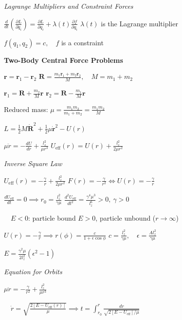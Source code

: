 \documentclass[twocolumn]{article}
\begin{document}
\vspace{-.5em}
\dotfill

\textit{Lagrange Multipliers and Constraint Forces}

$\frac{d}{dt} \left( \frac{\partial L}{\partial \dot{q}_i} \right) = \frac{\partial L}{\partial q_i} + \lambda(t) \frac{\partial f}{\partial q_i}$ \hfill $\lambda(t)$ is the Lagrange multiplier
 
$f(q_1, q_2) = c, \quad f$ is a constraint

\vspace{-.5em}
\dotfill

\textbf{Two-Body Central Force Problems}

$\mathbf{r} = \mathbf{r}_1 - \mathbf{r}_2$ \hfill $\mathbf{R} = \frac{m_1\mathbf{r}_1 + m_2\mathbf{r}_2}{M}, \quad M = m_1 + m_2$

$\mathbf r_1 = \mathbf R + \frac{m_2}{M} \mathbf r$ \hfill $\mathbf r_2 = \mathbf R - \frac{m_1}{M} \mathbf r$

Reduced mass: $\mu = \frac{m_1 m_2}{m_1 + m_2} = \frac{m_1 m_2}{M}$

$L = \frac{1}{2} M\dot{\mathbf{R}}^2 + \frac{1}{2} \mu \mathbf{\dot{r}}^2 - U(r)$

$\mu \ddot r = -\frac{dU}{dr} + \frac{l_z^2}{\mu r^3}$ \hfill $U_{\text{eff}}(r) = U(r) + \frac{l_z^2}{2\mu r^2}$

\dotfill

\textit{Inverse Square Law}

$U_{\text{eff}}(r) = -\frac{\gamma}{r} + \frac{l_z^2}{2 \mu r^2}$ \hfill $F(r) = -\frac{\gamma}{r^2} \iff U(r) = -\frac{\gamma}{r}$

$\frac{dU_{\text{eff}}}{dt} = 0 \implies r_0 = \frac{l_z^2}{\gamma \mu}$ \hfill $\frac{d^2 U_{\text{eff}}}{dt^2} = \frac{\gamma^4 \mu^3}{l_z^6} > 0,\ \gamma > 0$

$\quad E < 0$: particle bound \hfill $E > 0$, particle unbound ($r \to \infty$)

$U(r) = -\frac{\gamma}{r} \implies r(\phi) = \frac{c}{1+\epsilon \cos \phi}$ \hfill $c = \frac{l_z^2}{\gamma \mu},\quad \epsilon = \frac{Al_z^2}{\gamma \mu}$

$E = \frac{\gamma^2 \mu}{2l_z^2} (\epsilon^2 - 1)$

\dotfill

\textit{Equation for Orbits}

$\mu \ddot{r} = -\frac{\gamma}{r^2} + \frac{l_z^2}{\mu r^3}$

$\quad \dot r = \sqrt{\frac{2[E-U_{\text{eff}}(r)]}{\mu}} \implies t = \int_{r_0}^{r} \frac{dr}{\sqrt{2 [E-U_{\text{eff}}] / \mu}}$
\end{document}
